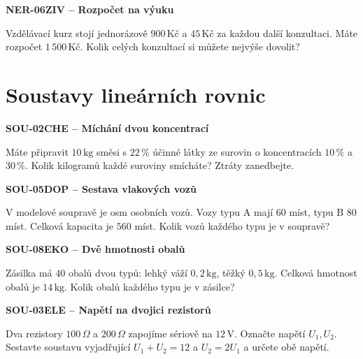 \documentclass[11pt,a4paper]{article}
\begin{document}
\vspace{4mm}\par\noindent\dotfill\par\medskip
\par\medskip\noindent\textbf{NER-06}\quad\textbf{ZIV -- Rozpočet na výuku}\par
Vzdělávací kurz stojí jednorázově $900\,\text{Kč}$ a $45\,\text{Kč}$ za každou další konzultaci. Máte rozpočet $1\,500\,\text{Kč}$. Kolik celých konzultací si můžete nejvýše dovolit?

\vspace{4mm}\par\noindent\dotfill\par\medskip

\section{Soustavy lineárních rovnic}
\par\medskip\noindent\textbf{SOU-02}\quad\textbf{CHE -- Míchání dvou koncentrací}\par
Máte připravit $10\,\mathrm{kg}$ směsi s $22\,\%$ účinné látky ze surovin o koncentracích $10\,\%$ a $30\,\%$. Kolik kilogramů každé suroviny smícháte? Ztráty zanedbejte.

\vspace{4mm}\par\noindent\dotfill\par\medskip
\par\medskip\noindent\textbf{SOU-05}\quad\textbf{DOP -- Sestava vlakových vozů}\par
V modelové soupravě je osm osobních vozů. Vozy typu A mají $60$ míst, typu B $80$ míst. Celková kapacita je $560$ míst. Kolik vozů každého typu je v soupravě?

\vspace{4mm}\par\noindent\dotfill\par\medskip
\par\medskip\noindent\textbf{SOU-08}\quad\textbf{EKO -- Dvě hmotnosti obalů}\par
Zásilka má $40$ obalů dvou typů: lehký váží $0{,}2\,\mathrm{kg}$, těžký $0{,}5\,\mathrm{kg}$. Celková hmotnost obalů je $14\,\mathrm{kg}$. Kolik obalů každého typu je v zásilce?

\vspace{4mm}\par\noindent\dotfill\par\medskip
\par\medskip\noindent\textbf{SOU-03}\quad\textbf{ELE -- Napětí na dvojici rezistorů}\par
Dva rezistory $100\,\Omega$ a $200\,\Omega$ zapojíme sériově na $12\,\mathrm V$. Označte napětí $U_1,U_2$. Sestavte soustavu vyjadřující $U_1+U_2=12$ a $U_2=2U_1$ a určete obě napětí.
\end{document}
